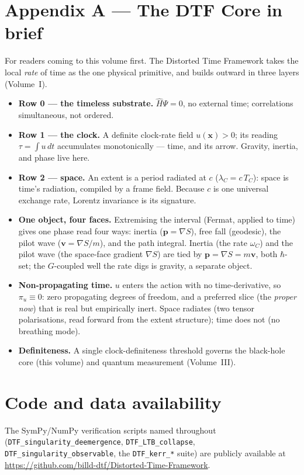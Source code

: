 \documentclass[11pt]{article}
\begin{document}
\appendix
\section*{Appendix A --- The DTF Core in brief}
\noindent For readers coming to this volume first. The Distorted Time Framework takes the local
\emph{rate} of time as the one physical primitive, and builds outward in three layers (Volume~I).
\begin{itemize}[leftmargin=1.4em,itemsep=3pt,topsep=3pt]
  \item \textbf{Row 0 --- the timeless substrate.} $\hat H\Psi=0$, no external time; correlations
    simultaneous, not ordered.
  \item \textbf{Row 1 --- the clock.} A definite clock-rate field $u(\mathbf x)>0$; its reading
    $\tau=\int u\,dt$ accumulates monotonically --- time, and its arrow. Gravity, inertia, and phase live
    here.
  \item \textbf{Row 2 --- space.} An extent is a period radiated at $c$ ($\lambda_C=c\,T_C$): space is
    time's radiation, compiled by a frame field. Because $c$ is one universal exchange rate, Lorentz
    invariance is its signature.
  \item \textbf{One object, four faces.} Extremising the interval (Fermat, applied to time) gives one
    phase read four ways: inertia ($\mathbf p=\nabla S$), free fall (geodesic), the pilot wave
    ($\mathbf v=\nabla S/m$), and the path integral. Inertia (the rate $\omega_C$) and the pilot wave (the
    space-face gradient $\nabla S$) are tied by $\mathbf p=\nabla S=m\mathbf v$, both $\hbar$-set; the
    $G$-coupled well the rate digs is gravity, a separate object.
  \item \textbf{Non-propagating time.} $u$ enters the action with no time-derivative, so $\pi_u\equiv0$:
    zero propagating degrees of freedom, and a preferred slice (the \emph{proper now}) that is real but
    empirically inert. Space radiates (two tensor polarisations, read forward from the extent structure); time does not (no breathing mode).
  \item \textbf{Definiteness.} A single clock-definiteness threshold governs the black-hole core (this
    volume) and quantum measurement (Volume~III).
\end{itemize}

\section*{Code and data availability}
{\small The SymPy/NumPy verification scripts named throughout (\texttt{DTF\_singularity\_deemergence},
\texttt{DTF\_LTB\_collapse}, \texttt{DTF\_singularity\_observable}, the \texttt{DTF\_kerr\_*} suite) are
publicly available at \url{https://github.com/billd-dtf/Distorted-Time-Framework}.\par}
\end{document}
